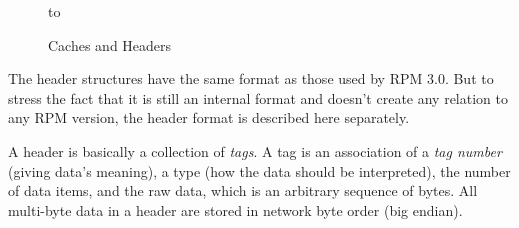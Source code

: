 \documentclass[10pt]{article}
\begin{document}
\begin{figure}[htb]
\hbox to 
\caption{Caches and Headers}
\label{fig-header}
\end{figure}

The header structures have the same format as those used by RPM 3.0.
But to stress the fact that it is still an internal format and doesn't
create any relation to any RPM version, the header format is described
here separately.

A header is basically a collection of {\em tags}. A tag is an
association of a {\em tag number} (giving data's meaning), a type (how
the data should be interpreted), the number of data items, and the raw
data, which is an arbitrary sequence of bytes. All multi-byte data in
a header are stored in network byte order (big endian).
\end{document}
